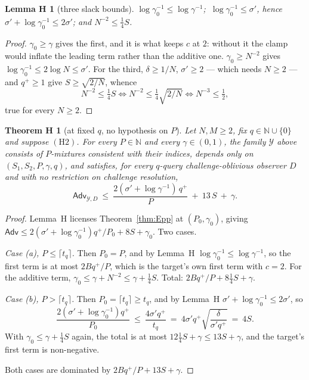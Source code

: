 \documentclass{aicr-solution}
\newcommand{\Adv}{\mathsf{Adv}}
\newtheorem*{lemHo}{Lemma H\textlf{1}}
\newtheorem*{thmH}{Theorem H}
\begin{document}
\begin{lemHo}[three slack bounds]
$\log \gamma_0^{-1} \le \log \gamma^{-1}$;
$\ \log \gamma_0^{-1} \le \sigma'$, hence
$\sigma' + \log \gamma_0^{-1} \le 2\sigma'$; and
$N^{-2} \le \tfrac{1}{4}S$.
\end{lemHo}

\begin{proof}
$\gamma_0 \ge \gamma$ gives the first, and it is what keeps $c$ at $2$: without it
the clamp would inflate the leading term rather than the additive one.
$\gamma_0 \ge N^{-2}$ gives $\log \gamma_0^{-1} \le 2\log N \le \sigma'$. For the
third, $\delta \ge 1/N$, $\sigma' \ge 2$ --- which needs $N \ge 2$ --- and
$q^{+} \ge 1$ give $S \ge \sqrt{2/N}$, whence
\[
  N^{-2} \le \tfrac14 S
  \iff N^{-2} \le \tfrac14\sqrt{2/N}
  \iff N^{-3} \le \tfrac12,
\]
true for every $N \ge 2$.
\end{proof}

\begin{thmH}[at fixed $q$, no hypothesis on $P$]
Let $N,M \ge 2$, fix $q \in \mathbb{N} \cup \{0\}$ and suppose $(\mathrm{H2})$. For
every $P \in \mathbb{N}$ and every $\gamma \in (0,1)$, the family $\mathcal{Y}$
above consists of $P$-mixtures consistent with their indices, depends only on
$(S_1,S_2,P,\gamma,q)$, and satisfies, for every $q$-query challenge-oblivious
observer $D$ and with no restriction on challenge resolution,
\[
  \Adv_{\mathcal{Y},D}
  \ \le\ \frac{2(\sigma' + \log\gamma^{-1})\,q^{+}}{P}
  \ +\ 13\,S \ +\ \gamma .
\]
\end{thmH}

\begin{proof}
Lemma~H licenses Theorem~\ref{thm:Epp} at $(P_0,\gamma_0)$, giving
$\Adv \le 2(\sigma' + \log\gamma_0^{-1})q^{+}/P_0 + 8S + \gamma_0$. Two cases.

\emph{Case (a), $P \le \lceil t_q \rceil$.} Then $P_0 = P$, and by
Lemma~H $\log\gamma_0^{-1} \le \log\gamma^{-1}$, so the first term is at
most $2Bq^{+}/P$, which is the target's own first term with $c = 2$. For the
additive term, $\gamma_0 \le \gamma + N^{-2} \le \gamma + \tfrac14 S$. Total:
$2Bq^{+}/P + 8\tfrac14 S + \gamma$.

\emph{Case (b), $P > \lceil t_q \rceil$.} Then $P_0 = \lceil t_q \rceil \ge t_q$,
and by Lemma~H $\sigma' + \log\gamma_0^{-1} \le 2\sigma'$, so
\[
  \frac{2(\sigma' + \log\gamma_0^{-1})q^{+}}{P_0}
  \ \le\ \frac{4\sigma' q^{+}}{t_q}
  \ =\ 4\sigma' q^{+}\sqrt{\frac{\delta}{\sigma' q^{+}}}
  \ =\ 4S .
\]
With $\gamma_0 \le \gamma + \tfrac14 S$ again, the total is at most
$12\tfrac14 S + \gamma \le 13S + \gamma$, and the target's first term is
non-negative.

Both cases are dominated by $2Bq^{+}/P + 13S + \gamma$.
\end{proof}
\end{document}
